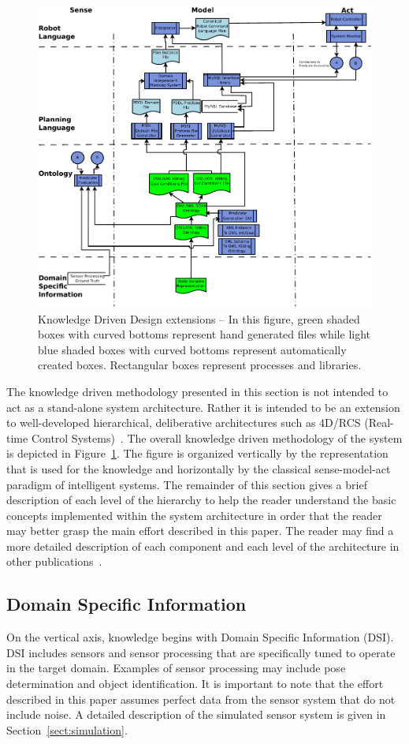\begin{figure}[!t!h!b!]
\centering
\includegraphics[width=12cm]{images/KnowledgeDrivenRobotics.pdf}
\caption{Knowledge Driven Design extensions -- In this figure, green shaded
  boxes with curved bottoms represent hand generated files while light blue
  shaded boxes with curved bottoms represent automatically created boxes.
  Rectangular boxes represent processes and libraries. }
\label{fig:methodology}
\end{figure}


The knowledge driven methodology presented in this section is not intended to act as a stand-alone system architecture. Rather it is intended to be an extension to well-developed hierarchical, deliberative architectures such as 4D/RCS (Real-time Control Systems)~\cite{Albus2000}. The overall knowledge driven methodology of the system is depicted in Figure~\ref{fig:methodology}. The figure is organized vertically by the representation that is used for the knowledge and horizontally by the classical sense-model-act paradigm of intelligent systems. The remainder of this section gives a brief description of each level of the hierarchy to help the reader understand the basic concepts implemented within the system architecture in order that the reader may better grasp the main effort described in this paper. The reader may find a more detailed description of each component and each level of the architecture in other publications~\cite{BALAKIRSKY.IROS.2012}.

\subsection{Domain Specific Information}
\label{subsection:DSI}
On the vertical axis, knowledge begins with Domain Specific Information (DSI). DSI includes sensors and sensor processing that are specifically tuned to operate in the target domain. Examples of sensor processing may include pose determination and object identification. It is important to note that the effort described in this paper assumes perfect data from the sensor system that do not include noise. A detailed description of the simulated sensor system is given in Section~\ref{sect:simulation}.

